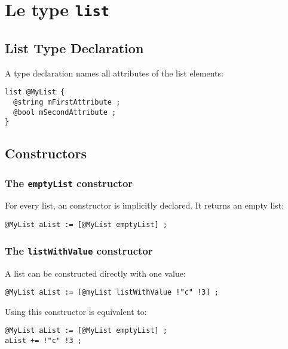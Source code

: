 
\chapter{Le type \texttt{list}}

\section{List Type Declaration}

A  type declaration names all attributes of the list elements:

\begin{lstlisting}[language=galgas]
list @MyList {
  @string mFirstAttribute ;
  @bool mSecondAttribute ;
}
\end{lstlisting}

\section{Constructors}

\subsection{The \texttt{emptyList} constructor}

For every list, an  constructor is implicitly declared. It returns an empty list:

\begin{lstlisting}[language=galgas]
@MyList aList := [@MyList emptyList] ;
\end{lstlisting}


\subsection{The \texttt{listWithValue} constructor}

A list can be constructed directly with one value:

\begin{lstlisting}[language=galgas]
@MyList aList := [@myList listWithValue !"c" !3] ;
\end{lstlisting}


Using this constructor is equivalent to:

\begin{lstlisting}[language=galgas]
@MyList aList := [@MyList emptyList] ;
aList += !"c" !3 ;
\end{lstlisting}

